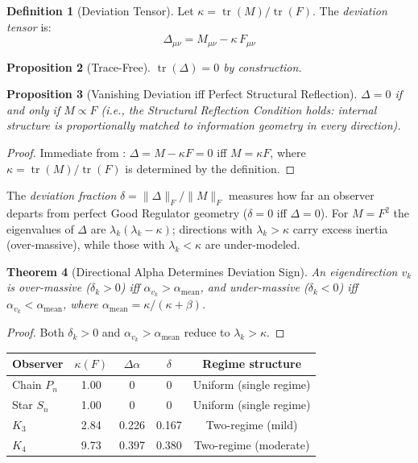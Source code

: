 \documentclass[11pt,a4paper]{article}
\theoremstyle{plain}
\newtheorem{theorem}{Theorem}[section]
\newtheorem{proposition}[theorem]{Proposition}
\theoremstyle{definition}
\newtheorem{definition}[theorem]{Definition}
\theoremstyle{remark}
\DeclareMathOperator{\tr}{tr}
\begin{document}
\begin{definition}[Deviation Tensor]
\label{def:deviation_tensor}
Let $\kappa = \tr(M)/\tr(F)$. The \emph{deviation tensor} is:
\begin{equation}
\label{eq:deviation_tensor}
\Delta_{\mu\nu} = M_{\mu\nu} - \kappa \, F_{\mu\nu}
\end{equation}
\end{definition}

\begin{proposition}[Trace-Free]
\label{prop:trace_free}
$\tr(\Delta) = 0$ by construction.
\end{proposition}

\begin{proposition}[Vanishing Deviation iff Perfect Structural Reflection]
\label{thm:delta_zero}
$\Delta = 0$ if and only if $M \propto F$ (i.e., the Structural Reflection Condition holds: internal structure is proportionally matched to information geometry in every direction).
\end{proposition}
\begin{proof}
Immediate from : $\Delta = M - \kappa F = 0$ iff $M = \kappa F$, where $\kappa = \tr(M)/\tr(F)$ is determined by the definition.
\end{proof}

The \emph{deviation fraction} $\delta = \|\Delta\|_F / \|M\|_F$ measures how far an observer departs from perfect Good Regulator geometry ($\delta = 0$ iff $\Delta = 0$). For $M = F^2$ the eigenvalues of $\Delta$ are $\lambda_k(\lambda_k - \kappa)$; directions with $\lambda_k > \kappa$ carry excess inertia (over-massive), while those with $\lambda_k < \kappa$ are under-modeled.

\begin{theorem}[Directional Alpha Determines Deviation Sign]
\label{thm:alpha_delta_connection}
An eigendirection $v_k$ is over-massive ($\delta_k > 0$) iff $\alpha_{v_k} > \alpha_{\mathrm{mean}}$, and under-massive ($\delta_k < 0$) iff $\alpha_{v_k} < \alpha_{\mathrm{mean}}$, where $\alpha_{\mathrm{mean}} = \kappa/(\kappa+\beta)$.
\end{theorem}
\begin{proof}
Both $\delta_k > 0$ and $\alpha_{v_k} > \alpha_{\mathrm{mean}}$ reduce to $\lambda_k > \kappa$.
\end{proof}

\begin{center}
\begin{tabular}{lcccc}
\hline
\textbf{Observer} & $\kappa(F)$ & $\Delta\alpha$ & $\delta$ & Regime structure \\
\hline
Chain $P_n$   & 1.00 & 0     & 0     & Uniform (single regime) \\
Star $S_n$    & 1.00 & 0     & 0     & Uniform (single regime) \\
$K_3$         & 2.84 & 0.226 & 0.167 & Two-regime (mild) \\
$K_4$         & 9.73 & 0.397 & 0.380 & Two-regime (moderate) \\
\hline
\end{tabular}
\end{center}
\end{document}
